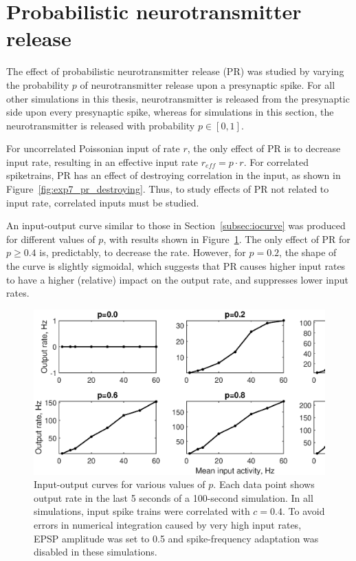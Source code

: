 \documentclass[a4paper,12pt]{report}
\theoremstyle{definition}
\begin{document}
\section{Probabilistic neurotransmitter release} %

The effect of probabilistic neurotransmitter release (PR) was studied by varying the probability $p$ of neurotransmitter release upon a presynaptic spike. For all other simulations in this thesis, neurotransmitter is released from the presynaptic side upon every presynaptic spike, whereas for simulations in this section, the neurotransmitter is released with probability $p \in [0,1]$.

For uncorrelated Poissonian input of rate $r$, the only effect of PR is to decrease input rate, resulting in an effective input rate $r_{eff} = p \cdot r$. For correlated spiketrains, PR has an effect of destroying correlation in the input, as shown in Figure~\ref{fig:exp7_pr_destroying}. Thus, to study effects of PR not related to input rate, correlated inputs must be studied.



An input-output curve similar to those in Section~\ref{subsec:iocurve} was produced for different values of $p$, with results shown in Figure~\ref{fig:exp8gridoutputs}. The only effect of PR for $p \geq 0.4$ is, predictably, to decrease the rate. However, for $p=0.2$, the shape of the curve is slightly sigmoidal, which suggests that PR causes higher input rates to have a higher (relative) impact on the output rate, and suppresses lower input rates.

\begin{figure}[!htb]
    \includegraphics[width=\textwidth]{figures/exp8_gridoutputs_epsp05.eps}
    \caption{Input-output curves for various values of $p$. Each data point shows output rate in the last 5 seconds of a 100-second simulation. In all simulations, input spike trains were correlated with $c=0.4$. To avoid errors in numerical integration caused by very high input rates, EPSP amplitude was set to 0.5 and spike-frequency adaptation was disabled in these simulations.}
    \label{fig:exp8gridoutputs}
\end{figure}
\end{document}
